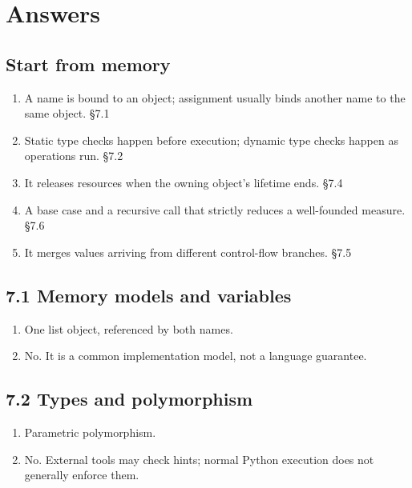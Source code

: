 \documentclass[11pt]{article}
\begin{document}
\section{Answers}
\begin{keepsection}\subsection{Start from memory}

\begin{enumerate}
\item A name is bound to an object; assignment usually binds another name to the same object. \hfill{\small\color{FAUblue}§7.1}
\item Static type checks happen before execution; dynamic type checks happen as operations run. \hfill{\small\color{FAUblue}§7.2}
\item It releases resources when the owning object’s lifetime ends. \hfill{\small\color{FAUblue}§7.4}
\item A base case and a recursive call that strictly reduces a well-founded measure. \hfill{\small\color{FAUblue}§7.6}
\item It merges values arriving from different control-flow branches. \hfill{\small\color{FAUblue}§7.5}
\end{enumerate}

\end{keepsection}
\begin{keepsection}\subsection{7.1 Memory models and variables}

\begin{enumerate}
\item One list object, referenced by both names.
\item No. It is a common implementation model, not a language guarantee.
\end{enumerate}

\end{keepsection}
\begin{keepsection}\subsection{7.2 Types and polymorphism}

\begin{enumerate}
\item Parametric polymorphism.
\item No. External tools may check hints; normal Python execution does not generally enforce them.
\end{enumerate}

\end{keepsection}
\end{document}
